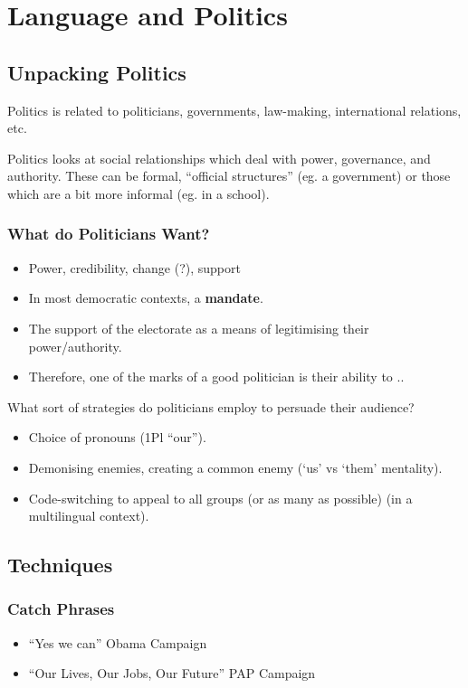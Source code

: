 \documentclass[../main.tex]{subfiles}
\begin{document}
	\section{Language and Politics}
		\subsection{Unpacking Politics}
			Politics is related to politicians, governments, law-making, international relations, etc. \par
			Politics looks at social relationships which deal with power, governance, and authority. These can be formal, ``official structures'' (eg. a government) or those which are a bit more informal (eg. in a school).

			\subsubsection{What do Politicians Want?}
				\begin{itemize}
					\item Power, credibility, change (?), support
					\item In most democratic contexts, a \textbf{mandate}.
					\item The support of the electorate as a means of legitimising their power/authority.
					\item Therefore, one of the marks of a good politician is their ability to ..
				\end{itemize}

				What sort of strategies do politicians employ to persuade their audience?
					\begin{itemize}
						\item Choice of pronouns (1Pl ``our'').
						\item Demonising enemies, creating a common enemy (`us' vs `them' mentality).
						\item Code-switching to appeal to all groups (or as many as possible) (in a multilingual context).
					\end{itemize}
		
		\subsection{Techniques}
			\subsubsection{Catch Phrases}
				\begin{itemize}
					\item ``Yes we can'' Obama Campaign
					\item ``Our Lives, Our Jobs, Our Future'' PAP Campaign
				\end{itemize}
				
\end{document}
